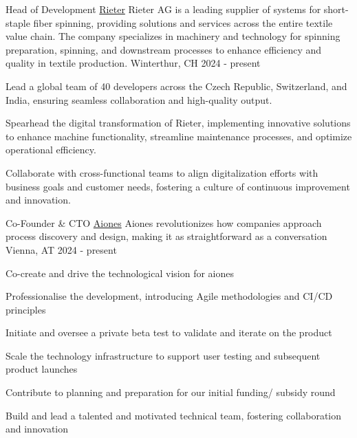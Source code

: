 
\begin{cventries}
  \cventry
    {Head of Development} %
    {\href{https://www.rieter.com}{Rieter}} %
    {Rieter AG is a leading supplier of systems for short-staple fiber spinning, providing solutions and services across the entire textile value chain. The company specializes in machinery and technology for spinning preparation, spinning, and downstream processes to enhance efficiency and quality in textile production.} %
    {Winterthur, CH} %
    {2024 - present} %
    {
        \begin{cvitems}
            \item {Lead a global team of 40 developers across the Czech Republic, Switzerland, and India, ensuring seamless collaboration and high-quality output.}
            \item {Spearhead the digital transformation of Rieter, implementing innovative solutions to enhance machine functionality, streamline maintenance processes, and optimize operational efficiency.}
            \item {Collaborate with cross-functional teams to align digitalization efforts with business goals and customer needs, fostering a culture of continuous improvement and innovation.}
        \end{cvitems}
    }
  \cventry
  {Co-Founder \& CTO} %
  {\href{https://www.aiones.ai}{Aiones}} %
  {Aiones revolutionizes how companies approach process discovery and design, making it as straightforward as a conversation} %
  {Vienna, AT} %
  {2024 - present} %
  {
    \begin{cvitems} %
      \item {Co-create and drive the technological vision for aiones}
      \item {Professionalise the development, introducing Agile methodologies and CI/CD principles}
      \item {Initiate and oversee a private beta test to validate and iterate on the product}
      \item {Scale the technology infrastructure to support user testing and subsequent product launches}
      \item {Contribute to planning and preparation for our initial funding/ subsidy round}
      \item {Build and lead a talented and motivated technical team, fostering collaboration and innovation}

\end{cvitems}}
\end{cventries}
